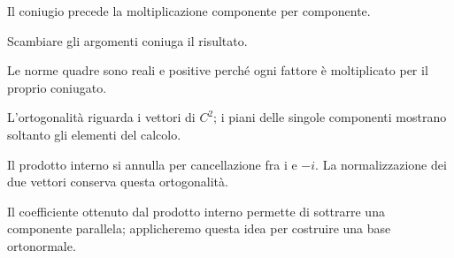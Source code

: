 Il coniugio precede la moltiplicazione componente per componente.\par


\label{c2-prodotto-interno-example-2-step-2}


Scambiare gli argomenti coniuga il risultato.\par


\label{c2-prodotto-interno-example-2-step-3}


Le norme quadre sono reali e positive perché ogni fattore è moltiplicato per il proprio coniugato.\par


\label{c2-prodotto-interno-example-2-step-4}


L'ortogonalità riguarda i vettori di \(C^{2}\); i piani delle singole componenti mostrano soltanto gli elementi del calcolo.\par



Il prodotto interno si annulla per cancellazione fra i e \(- i\). La normalizzazione dei due vettori conserva questa ortogonalità.\par


Il coefficiente ottenuto dal prodotto interno permette di sottrarre una componente parallela; applicheremo questa idea per costruire una base ortonormale.\par


